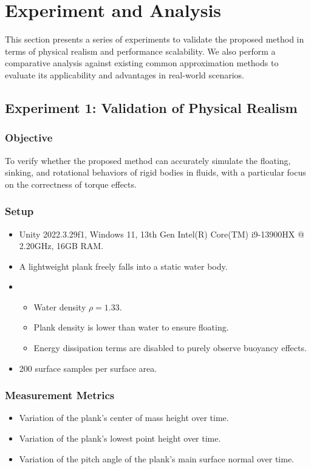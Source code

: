 \section{Experiment and Analysis}

This section presents a series of experiments to validate the proposed method in terms of physical realism and performance scalability. We also perform a comparative analysis against existing common approximation methods to evaluate its applicability and advantages in real-world scenarios.

\subsection*{Experiment 1: Validation of Physical Realism}

\subsubsection*{Objective}
To verify whether the proposed method can accurately simulate the floating, sinking, and rotational behaviors of rigid bodies in fluids, with a particular focus on the correctness of torque effects.

\subsubsection*{Setup}
\begin{itemize}
		\item {} Unity 2022.3.29f1, Windows 11, 13th Gen Intel(R) Core(TM) i9-13900HX @ 2.20GHz, 16GB RAM.
		\item {} A lightweight plank freely falls into a static water body.
		\item {}
		\begin{itemize}
				\item Water density $\rho = 1.33$.
				\item Plank density is lower than water to ensure floating.
				\item Energy dissipation terms are disabled to purely observe buoyancy effects.
		\end{itemize}
		\item {} 200 surface samples per surface area.
\end{itemize}

\subsubsection*{Measurement Metrics}
\begin{itemize}
		\item Variation of the plank's center of mass height over time.
		\item Variation of the plank's lowest point height over time.
		\item Variation of the pitch angle of the plank's main surface normal over time.
\end{itemize}

